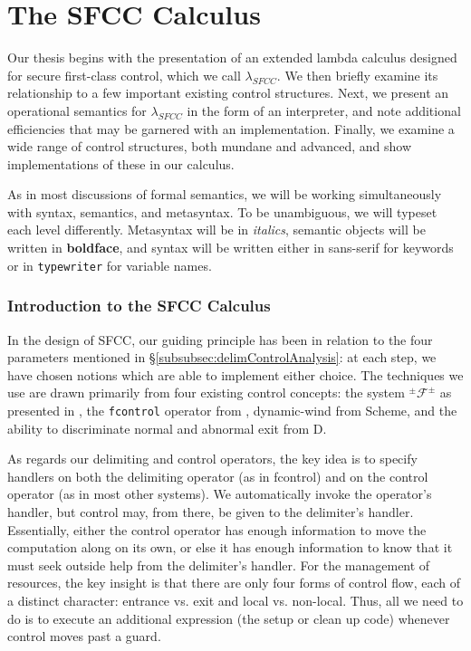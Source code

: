 \documentclass[11pt]{article}
\newcommand{\maybePage}{\null}
\newcommand\F{\mathcal{F}}
\newcommand\pmFpm{^\pm\F^\pm}
\begin{document}



\maybePage
\part{The SFCC Calculus}

Our thesis begins with the presentation of an extended lambda calculus designed for secure first-class control, which we call $\lambda_{SFCC}$.
We then briefly examine its relationship to a few important existing control structures.
Next, we present an operational semantics for $\lambda_{SFCC}$ in the form of an interpreter, and note additional efficiencies that may be garnered with an implementation.
Finally, we examine a wide range of control structures, both mundane and advanced, and show implementations of these in our calculus.

As in most discussions of formal semantics, we will be working simultaneously with syntax, semantics, and metasyntax. To be unambiguous, we will typeset each level differently. Metasyntax will be in \textit{italics}, semantic objects will be written in \textbf{boldface}, and syntax will be written either in \textsf{sans-serif} for keywords or in \texttt{typewriter} for variable names.





\maybePage
\section{Introduction to the SFCC Calculus}
\label{sec:SFCCcalculus}

In the design of SFCC, our guiding principle has been in relation to the four parameters mentioned in \S\ref{subsubsec:delimControlAnalysis}:
at each step, we have chosen notions which are able to implement either choice.
The techniques we use are drawn primarily from four existing control concepts:
the system $\pmFpm$ as presented in \cite{MFDC}, the \texttt{fcontrol} operator from \cite{HandlingControl}, dynamic-wind from Scheme, and the ability to discriminate normal and abnormal exit from D.

As regards our delimiting and control operators, the key idea is to specify handlers on both the delimiting operator (as in fcontrol) and on the control operator (as in most other systems).
We automatically invoke the operator's handler, but control may, from there, be given to the delimiter's handler.
Essentially, either the control operator has enough information to move the computation along on its own, or else it has enough information to know that it must seek outside help from the delimiter's handler.
For the management of resources, the key insight is that there are only four forms of control flow, each of a distinct character: entrance vs. exit and local vs. non-local.
Thus, all we need to do is to execute an additional expression (the setup or clean up code) whenever control moves past a guard.
\end{document}
